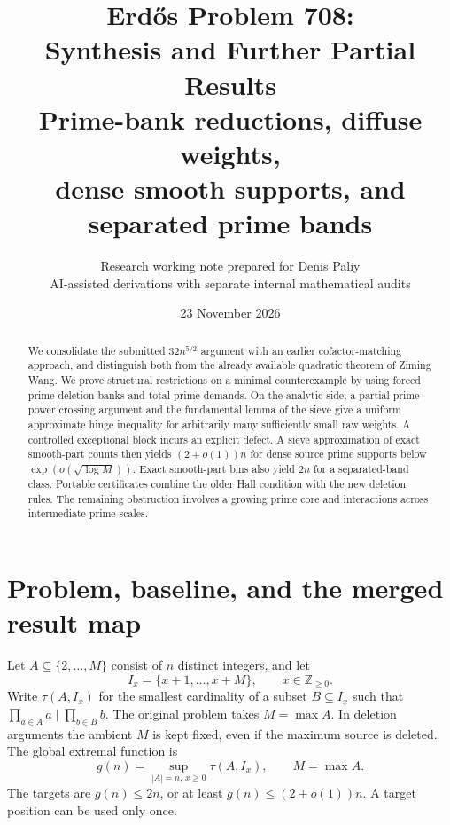 \documentclass[11pt,a4paper]{article}
\title{\textbf{Erd\H{o}s Problem 708:\\Synthesis and Further Partial Results}\\[5pt]
\large Prime-bank reductions, diffuse weights,\\dense smooth supports, and separated prime bands}
\author{Research working note prepared for Denis Paliy\\
\small AI-assisted derivations with separate internal mathematical audits}
\date{23 November 2026}
\theoremstyle{remark}
\begin{document}
\maketitle
\begin{center}
\end{center}
\begin{abstract}
We consolidate the submitted \(32n^{5/2}\) argument with an earlier
cofactor-matching approach, and distinguish both from the already
available quadratic theorem of Ziming Wang. We prove structural
restrictions on a minimal counterexample by using forced prime-deletion
banks and total prime demands. On the analytic side, a partial
prime-power crossing argument and the fundamental lemma of the sieve
give a uniform approximate hinge inequality for arbitrarily many
sufficiently small raw weights. A controlled exceptional block incurs
an explicit defect. A sieve approximation of exact smooth-part counts
then yields \((2+o(1))n\) for dense source prime supports below
\(\exp(o(\sqrt{\log M}))\). Exact smooth-part bins also yield \(2n\)
for a separated-band class. Portable certificates combine the older
Hall condition with the new deletion rules. The remaining obstruction
involves a growing prime core and interactions across intermediate
prime scales.
\end{abstract}
\begingroup
\small
\setcounter{tocdepth}{1}
\setlength{\parskip}{1pt}
\makeatletter
\renewcommand{\l@section}[2]{\@dottedtocline{1}{0em}{2em}{#1}{#2}}
\makeatother
\tableofcontents
\endgroup
\newpage

\section{Problem, baseline, and the merged result map}
\label{root:scope}

Let \(A\subseteq\{2,\ldots,M\}\) consist of \(n\) distinct integers,
and let
\[
 I_x=\{x+1,\ldots,x+M\},\qquad x\in\mathbb Z_{\ge0}.
\]
Write \(\tau(A,I_x)\) for the smallest cardinality of a subset
\(B\subseteq I_x\) such that \(\prod_{a\in A}a\mid\prod_{b\in B}b\).
The original problem takes \(M=\max A\). In deletion arguments the
ambient \(M\) is kept fixed, even if the maximum source is deleted.
The global extremal function is
\[
 g(n)=\sup_{|A|=n,\,x\ge0}\tau(A,I_x),\qquad M=\max A.
\]
The targets are \(g(n)\le2n\), or at least
\(g(n)\le(2+o(1))n\). A target position can be used only once.
\end{document}
